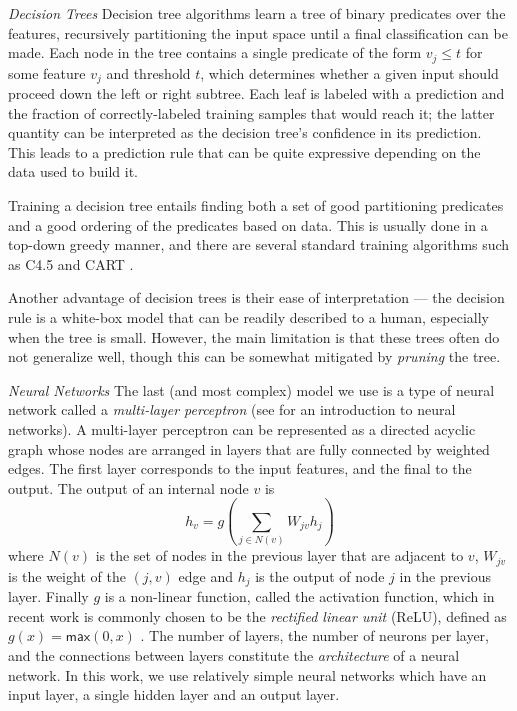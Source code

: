 \documentclass[conference]{IEEEtran}
\begin{document}
\emph{Decision Trees}
Decision tree algorithms learn a tree of binary predicates over the
features, recursively partitioning the input space until a final
classification can be made.
%
Each node in the tree contains a single predicate of the form
$v_j \leq t$ for some feature $v_j$ and threshold $t$, which determines
whether a given input should proceed down the left or right subtree.
%
Each leaf is labeled with a prediction and the fraction of
correctly-labeled training samples that would reach it; the latter
quantity can be interpreted as the decision tree's confidence in its
prediction.
%
This leads to a prediction rule that can be quite expressive depending
on the data used to build it.

Training a decision tree entails finding both a set of good partitioning
predicates and a good ordering of the predicates based on data.
%
This is usually done in a top-down greedy manner, and there are several
standard training algorithms such as C4.5 \cite{Quinlan1993-de} and
CART \cite{Breiman1984-qy}.

Another advantage of decision trees is their ease of interpretation ---
the decision rule is a white-box model that can be readily described to
a human, especially when the tree is small.
%
However, the main limitation is that these trees often do not generalize
well, though this can be somewhat mitigated by \emph{pruning} the tree.

\emph{Neural Networks}
%
The last (and most complex) model we use is a type of neural network
called a \emph{multi-layer perceptron} (see \cite{Nielsen2015-pu} for
an introduction to neural networks).
%
A multi-layer perceptron can be represented as a directed acyclic
graph whose nodes are arranged in layers that are fully connected by
weighted edges.
%
The first layer corresponds to the input features, and the final to the
output.
%
The output of an internal node $v$ is
%
\[ h_v = g(\sum_{j \in N(v)} W_{jv} h_j ) \]
%
where $N(v)$ is the set of nodes in the previous layer that are adjacent
to $v$, $W_{jv}$ is the weight of the $(j, v)$ edge and $h_j$ is the
output of node $j$ in the previous layer.
%
Finally $g$ is a non-linear function, called the activation function,
which in recent work is commonly chosen to be the \emph{rectified linear
  unit} (ReLU), defined as $g(x) = \mathsf{max}(0,x)$
\cite{Nair2010-xg}.
%
The number of layers, the number of neurons per layer, and the
connections between layers constitute the \emph{architecture} of a
neural network.
%
In this work, we use relatively simple neural networks which have an
input layer, a single hidden layer and an output layer.
\end{document}
